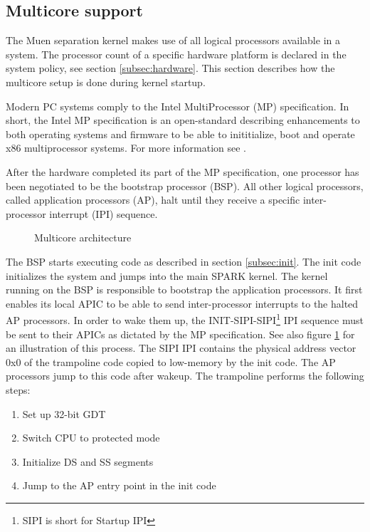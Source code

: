\subsection{Multicore support}\label{subsec:mp-support}
The Muen separation kernel makes use of all logical processors available in a
system. The processor count of a specific hardware platform is declared in the
system policy, see section \ref{subsec:hardware}. This section describes how
the multicore setup is done during kernel startup.

Modern PC systems comply to the Intel MultiProcessor (MP)
specification. In short, the Intel MP specification is an open-standard
describing enhancements to both operating systems and firmware to be able to
inititialize, boot and operate x86 multiprocessor systems. For more information
see \cite{intel:mp}.

After the hardware completed its part of the MP specification, one processor
has been negotiated to be the bootstrap processor (BSP). All other
logical processors, called application processors (AP), halt until
they receive a specific inter-processor interrupt (IPI) sequence.

\begin{figure}[h]
	\centering
	
	\caption{Multicore architecture}
	\label{fig:mp-overview}
\end{figure}

The BSP starts executing code as described in section \ref{subsec:init}. The
init code initializes the system and jumps into the main SPARK kernel. The
kernel running on the BSP is responsible to bootstrap the application
processors. It first enables its local APIC to be able to send
inter-processor interrupts to the halted AP processors. In order to wake them
up, the INIT-SIPI-SIPI\footnote{SIPI is short for Startup
IPI} IPI sequence must be sent to their
APICs as dictated by the MP specification. See also figure
\ref{fig:mp-overview} for an illustration of this process. The SIPI IPI
contains the physical address vector 0x0 of the trampoline code copied to
low-memory by the init code. The AP processors jump
to this code after wakeup. The trampoline performs the following steps:

\begin{enumerate}
	\item Set up 32-bit GDT
	\item Switch CPU to protected mode
	\item Initialize DS and SS segments
	\item Jump to the AP entry point in the init code
\end{enumerate}

